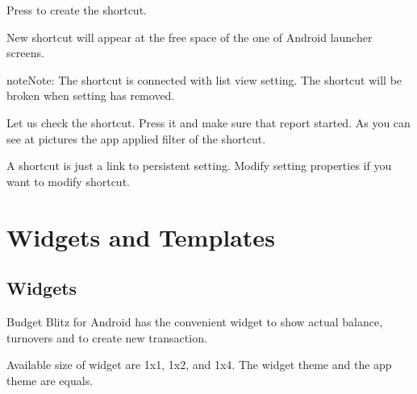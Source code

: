 \documentclass[a4paper,10pt,english]{sphinxmanual}
\begin{document}
Press  to create the shortcut.

\noindent{}

\noindent{}

New shortcut will appear at the free space of the one of Android launcher screens.

\begin{sphinxadmonition}{note}{Note:}
The shortcut is connected with list view setting. The shortcut will be broken when setting has removed.
\end{sphinxadmonition}

\noindent{}

\noindent{}

\noindent{}

Let us check the shortcut. Press it and make sure that report started. As you can see at pictures the app
applied filter of the shortcut.

A shortcut is just a link to persistent setting. Modify setting properties if you want to modify shortcut.


\chapter{Widgets and Templates}
\label{\detokenize{widgets:widgets-and-templates}}\label{\detokenize{widgets:chapter-widgets}}\label{\detokenize{widgets::doc}}

\section{Widgets}
\label{\detokenize{widgets:widgets}}
Budget Blitz for Android has the convenient widget to show actual balance, turnovers and to create new transaction.


Available size of widget are 1x1, 1x2, and 1x4. The widget theme and the app theme are equals.
\end{document}
